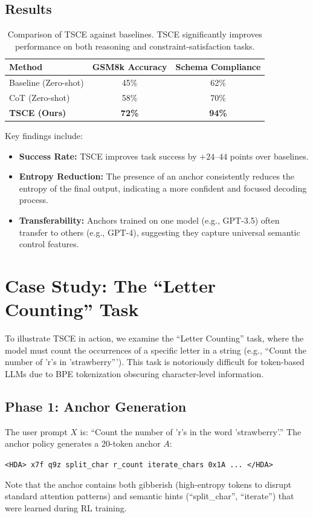 \documentclass[11pt]{article}
\begin{document}
\subsection{Results}
\begin{table}[H]
\centering
\begin{tabular}{lcc}
\toprule
\textbf{Method} & \textbf{GSM8k Accuracy} & \textbf{Schema Compliance} \\
\midrule
Baseline (Zero-shot) & 45\% & 62\% \\
CoT (Zero-shot) & 58\% & 70\% \\
\textbf{TSCE (Ours)} & \textbf{72\%} & \textbf{94\%} \\
\bottomrule
\end{tabular}
\caption{Comparison of TSCE against baselines. TSCE significantly improves performance on both reasoning and constraint-satisfaction tasks.}
\label{tab:results}
\end{table}

Key findings include:
\begin{itemize}
    \item \textbf{Success Rate:} TSCE improves task success by $+24$--$44$ points over baselines.
    \item \textbf{Entropy Reduction:} The presence of an anchor consistently reduces the entropy of the final output, indicating a more confident and focused decoding process.
    \item \textbf{Transferability:} Anchors trained on one model (e.g., GPT-3.5) often transfer to others (e.g., GPT-4), suggesting they capture universal semantic control features.
\end{itemize}

\section{Case Study: The ``Letter Counting'' Task}
To illustrate TSCE in action, we examine the ``Letter Counting'' task, where the model must count the occurrences of a specific letter in a string (e.g., ``Count the number of 'r's in 'strawberry'''). This task is notoriously difficult for token-based LLMs due to BPE tokenization obscuring character-level information.

\subsection{Phase 1: Anchor Generation}
The user prompt $X$ is: ``Count the number of 'r's in the word 'strawberry'.''
The anchor policy generates a 20-token anchor $A$:
\begin{center}
\texttt{<HDA> x7f q9z split\_char r\_count iterate\_chars 0x1A ... </HDA>}
\end{center}
Note that the anchor contains both gibberish (high-entropy tokens to disrupt standard attention patterns) and semantic hints (``split\_char'', ``iterate'') that were learned during RL training.
\end{document}
